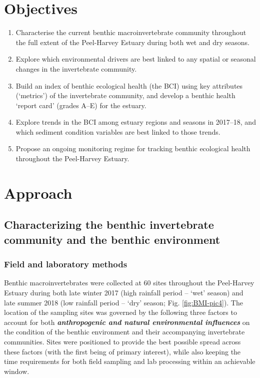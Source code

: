 \documentclass[
]{book}
\begin{document}
\hypertarget{objectives}{%
\section{Objectives}\label{objectives}}

\begin{enumerate}
\def\labelenumi{\arabic{enumi}.}
\item
  Characterise the current benthic macroinvertebrate community throughout the full extent of the Peel-Harvey Estuary during both wet and dry seasons.
\item
  Explore which environmental drivers are best linked to any spatial or seasonal changes in the invertebrate community.
\item
  Build an index of benthic ecological health (the BCI) using key attributes (`metrics') of the invertebrate community, and develop a benthic health `report card' (grades A--E) for the estuary.
\item
  Explore trends in the BCI among estuary regions and seasons in 2017--18, and which sediment condition variables are best linked to those trends.
\item
  Propose an ongoing monitoring regime for tracking benthic ecological health throughout the Peel-Harvey Estuary.
\end{enumerate}

\hypertarget{approach}{%
\section{Approach}\label{approach}}

\hypertarget{characterizing-the-benthic-invertebrate-community-and-the-benthic-environment}{%
\subsection{Characterizing the benthic invertebrate community and the benthic environment}\label{characterizing-the-benthic-invertebrate-community-and-the-benthic-environment}}

\hypertarget{field-and-laboratory-methods}{%
\subsubsection{Field and laboratory methods}\label{field-and-laboratory-methods}}

Benthic macroinvertebrates were collected at 60 sites throughout the Peel-Harvey Estuary during both late winter 2017 (high rainfall period -- `wet' season) and late summer 2018 (low rainfall period -- `dry' season; Fig. \ref{fig:BMI-pic4}). The location of the sampling sites was governed by the following three factors to account for both \textbf{\emph{anthropogenic and natural environmental influences}} on the condition of the benthic environment and their accompanying invertebrate communities. Sites were positioned to provide the best possible spread across these factors (with the first being of primary interest), while also keeping the time requirements for both field sampling and lab processing within an achievable window.
\end{document}
